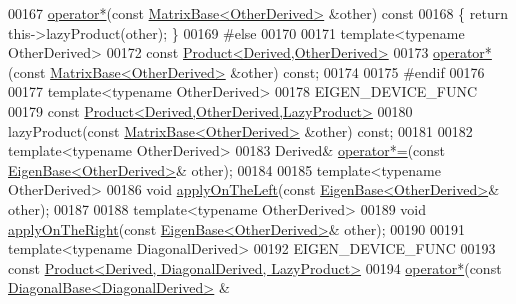 \begin{DoxyCode}
00167     \hyperlink{group___core___module_ae2d220efbf7047f0894787888288cfcc}{operator*}(\textcolor{keyword}{const} \hyperlink{group___core___module_class_eigen_1_1_matrix_base}{MatrixBase<OtherDerived>} &other)\textcolor{keyword}{ const}
00168 \textcolor{keyword}{    }\{ \textcolor{keywordflow}{return} this->lazyProduct(other); \}
00169 \textcolor{preprocessor}{#else}
00170 
00171     \textcolor{keyword}{template}<\textcolor{keyword}{typename} OtherDerived>
00172     \textcolor{keyword}{const} \hyperlink{group___core___module_class_eigen_1_1_product}{Product<Derived,OtherDerived>}
00173     \hyperlink{group___core___module_ae2d220efbf7047f0894787888288cfcc}{operator*}(\textcolor{keyword}{const} \hyperlink{group___core___module_class_eigen_1_1_matrix_base}{MatrixBase<OtherDerived>} &other) \textcolor{keyword}{const};
00174 
00175 \textcolor{preprocessor}{#endif}
00176 
00177     \textcolor{keyword}{template}<\textcolor{keyword}{typename} OtherDerived>
00178     EIGEN\_DEVICE\_FUNC
00179     \textcolor{keyword}{const} \hyperlink{group___core___module_class_eigen_1_1_product}{Product<Derived,OtherDerived,LazyProduct>}
00180     lazyProduct(\textcolor{keyword}{const} \hyperlink{group___core___module_class_eigen_1_1_matrix_base}{MatrixBase<OtherDerived>} &other) \textcolor{keyword}{const};
00181 
00182     \textcolor{keyword}{template}<\textcolor{keyword}{typename} OtherDerived>
00183     Derived& \hyperlink{group___core___module_a3783b6168995ca117a1c19fea3630ac4}{operator*=}(\textcolor{keyword}{const} \hyperlink{group___core___module_struct_eigen_1_1_eigen_base}{EigenBase<OtherDerived>}& other);
00184 
00185     \textcolor{keyword}{template}<\textcolor{keyword}{typename} OtherDerived>
00186     \textcolor{keywordtype}{void} \hyperlink{group___core___module_a3a08ad41e81d8ad4a37b5d5c7490e765}{applyOnTheLeft}(\textcolor{keyword}{const} \hyperlink{group___core___module_struct_eigen_1_1_eigen_base}{EigenBase<OtherDerived>}& other);
00187 
00188     \textcolor{keyword}{template}<\textcolor{keyword}{typename} OtherDerived>
00189     \textcolor{keywordtype}{void} \hyperlink{group___core___module_a45d91752925d2757fc8058a293b15462}{applyOnTheRight}(\textcolor{keyword}{const} \hyperlink{group___core___module_struct_eigen_1_1_eigen_base}{EigenBase<OtherDerived>}& other);
00190 
00191     \textcolor{keyword}{template}<\textcolor{keyword}{typename} DiagonalDerived>
00192     EIGEN\_DEVICE\_FUNC
00193     \textcolor{keyword}{const} \hyperlink{group___core___module_class_eigen_1_1_product}{Product<Derived, DiagonalDerived, LazyProduct>}
00194     \hyperlink{group___core___module_ae2d220efbf7047f0894787888288cfcc}{operator*}(\textcolor{keyword}{const} \hyperlink{class_eigen_1_1_diagonal_base}{DiagonalBase<DiagonalDerived>} &

\end{DoxyCode}
